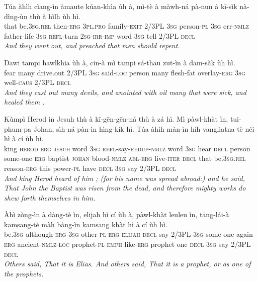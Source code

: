 \documentclass[11pt,a4paper]{article}
\begin{document}
\begin{exe}
\gll Túa àhìh cìang-ìn àmaute kúan-khìa ùh à, mì-tè à màwh-ná pà-nun à kī-sìk nà-dìng-ùn thù à hìlh ùh hì. \\
     that be.\textsc{3sg}.\textsc{rel} then-\textsc{erg} \textsc{3pl}.\textsc{pro} family-\textsc{exit} 2/3PL \textsc{3sg} person-\textsc{pl} \textsc{3sg} err-\textsc{nmlz} father-life \textsc{3sg} \textsc{refl}-turn \textsc{2sg}-\textsc{irr}-\textsc{imp} word \textsc{3sg} tell 2/3PL \textsc{decl} \\
\glt \textcolor{kjvcolor}{\textit{And they went out, and preached that men should repent.}}

\gll Dawi tampi hawlkhia ùh à, cin-à mì tampi sá-thāu zut-ìn à dām-sàk ùh hì. \\
     fear many drive.out 2/3PL \textsc{3sg} said-\textsc{loc} person many flesh-fat overlay-\textsc{erg} \textsc{3sg} well-\textsc{caus} 2/3PL \textsc{decl} \\
\glt \textcolor{kjvcolor}{\textit{And they cast out many devils, and anointed with oil many that were sick, and healed them .}}

\gll Kùmpì Herod ìn Jesuh thù à kī-gēn-gēn-ná thù à zá hì. Mì pàwl-khàt ìn, tui-phum-pa Johan, sìh-ná pàn-ìn hìng-kík hì. Túa àhìh màn-ìn híh vangliatna-tè néi hì à cí ùh hì. \\
     king \textsc{herod} \textsc{erg} \textsc{jesuh} word \textsc{3sg} \textsc{refl}-say-\textsc{redup}-\textsc{nmlz} word \textsc{3sg} hear \textsc{decl} person some-one \textsc{erg} baptist \textsc{johan} blood-\textsc{nmlz} \textsc{abl}-\textsc{erg} live-\textsc{iter} \textsc{decl} that be.\textsc{3sg}.\textsc{rel} reason-\textsc{erg} this power-\textsc{pl} have \textsc{decl} \textsc{3sg} say 2/3PL \textsc{decl} \\
\glt \textcolor{kjvcolor}{\textit{And king Herod heard of him ; (for his name was spread abroad:) and he said, That John the Baptist was risen from the dead, and therefore mighty works do shew forth themselves in him.}}

\gll Àhì zòng-ìn à dàng-tè ìn, elijah hì cí ùh à, pàwl-khàt leuleu ìn, tāng-lái-à kamsang-tè màh bàng-ìn kamsang khàt hì à cí ùh hì. \\
     be.\textsc{3sg} although-\textsc{erg} \textsc{3sg} other-\textsc{pl} \textsc{erg} \textsc{elijah} \textsc{decl} say 2/3PL \textsc{3sg} some-one again \textsc{erg} ancient-\textsc{nmlz}-\textsc{loc} prophet-\textsc{pl} \textsc{emph} like-\textsc{erg} prophet one \textsc{decl} \textsc{3sg} say 2/3PL \textsc{decl} \\
\glt \textcolor{kjvcolor}{\textit{Others said, That it is Elias. And others said, That it is a prophet, or as one of the prophets.}}


\end{exe}
\end{document}
